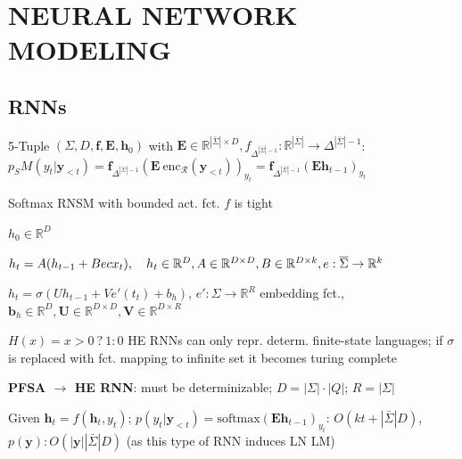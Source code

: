 \section{NEURAL NETWORK MODELING}

\subsection{RNNs}

 5-Tuple $(\Sigma, D, \mathbf{f}, \mathbf{E}, \mathbf{h}_0)$ with $\mathbf{E}\in \mathbb{R}^{|\bar{\Sigma}|\times D}, {f}_{\Delta^{|\bar{\Sigma}|-1}}:\mathbb{R^{|\bar{\Sigma}|}}\to\Delta^{|\bar{\Sigma}|-1}$:
$p_SM(y_t|\mathbf{y}_{<t})=\mathbf{f}_{\Delta^{|\bar{\Sigma}|-1}}(\mathbf{E}\ \text{enc}_\mathcal{R}(\mathbf{y}_{<t}))_{y_t}=\mathbf{f}_{\Delta^{|\bar{\Sigma}|-1}}(\mathbf{Eh}_{t-1})_{y_t}$

\theorem Softmax RNSM with bounded act. fct. $f$ is tight

\begin{enumerate*}[label=\textbullet, itemjoin={\quad}]
    \item \(h_0 \in \mathbb{R}^D\)
    \item \(h_t = A(h_{t-1}+Becx_t), \quad h_t\in \mathbb{R}^D, \\A\in \mathbb{R}^{D\times D}, B\in \mathbb{R}^{D\times k}, e: \bar{\Sigma} \to \mathbb{R}^k \)
\end{enumerate*}

 \(h_t = \sigma(Uh_{t-1}+Ve'(t_t)+b_h)\), $e':\Sigma\to\mathbb{R}^R$ embedding fct., $\mathbf{b}_h\in\mathbb{R}^D, \mathbf{U}\in\mathbb{R}^{D\times D}, \mathbf{V}\in\mathbb{R}^{D\times R}$

 $H(x) = x>0 \ ? \  1:0 $
\comment HE RNNs can only repr. determ. finite-state languages; if $\sigma$ is replaced with fct. mapping to infinite set it becomes turing complete

\textbf{PFSA $\to$ HE RNN}: must be determinizable; $D=|\Sigma|\cdot|Q|$; $R=|\Sigma|$

\example
Given \(\mathbf{h}_t = f(\mathbf{h}_t, y_t)\); \(p(y_t|\mathbf{y}_{<t}) = \text{softmax}(\mathbf{Eh}_{t-1})_{y_t}\): \(O(kt+|\bar{\Sigma}|D)\), \(p(\mathbf{y}): O(|\mathbf{y}||\bar{\Sigma}|D)\) (as this type of RNN induces LN LM)


